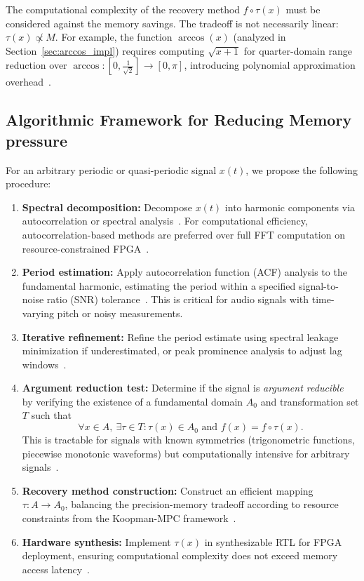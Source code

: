 \begin{note}
The computational complexity of the recovery method $f \circ \tau(x)$ must be considered against the memory savings. The tradeoff is not necessarily linear: $\tau(x) \not\propto M$. For example, the function $\arccos(x)$ (analyzed in Section~\ref{sec:arccos_impl}) requires computing $\sqrt{x + 1}$ for quarter-domain range reduction over $\arccos: [0, \frac{1}{\sqrt{2}}] \to [0, \pi]$, introducing polynomial approximation overhead~\cite{Muller2006}.
\end{note}

\subsection{Algorithmic Framework for Reducing Memory pressure}

For an arbitrary periodic or quasi-periodic signal $x(t)$, we propose the following procedure:

\begin{enumerate}
    \item \textbf{Spectral decomposition:} Decompose $x(t)$ into harmonic components via autocorrelation or spectral analysis~\cite{OppenheimSchafer2010}. For computational efficiency, autocorrelation-based methods are preferred over full FFT computation on resource-constrained FPGA~\cite{SinhaSrikanthan2014}.

    \item \textbf{Period estimation:} Apply autocorrelation function (ACF) analysis to the fundamental harmonic, estimating the period within a specified signal-to-noise ratio (SNR) tolerance~\cite{Das2017}. This is critical for audio signals with time-varying pitch or noisy measurements.

    \item \textbf{Iterative refinement:} Refine the period estimate using spectral leakage minimization if underestimated, or peak prominence analysis to adjust lag windows~\cite{OppenheimSchafer2010}.

    \item \textbf{Argument reduction test:} Determine if the signal is \emph{argument reducible}~\cite{Muller2006} by verifying the existence of a fundamental domain $A_0$ and transformation set $T$ such that
    \[
        \forall x \in A, \ \exists \tau \in T : \tau(x) \in A_0 \text{ and } f(x) = f \circ \tau(x).
    \]
    This is tractable for signals with known symmetries (trigonometric functions, piecewise monotonic waveforms) but computationally intensive for arbitrary signals~\cite{Muller2006}.

    \item \textbf{Recovery method construction:} Construct an efficient mapping $\tau: A \to A_0$, balancing the precision-memory tradeoff according to resource constraints from the Koopman-MPC framework~\cite{Bhandari2012}.

    \item \textbf{Hardware synthesis:} Implement $\tau(x)$ in synthesizable RTL for FPGA deployment, ensuring computational complexity does not exceed memory access latency~\cite{SinhaSrikanthan2014,Silva2016}.
\end{enumerate}

